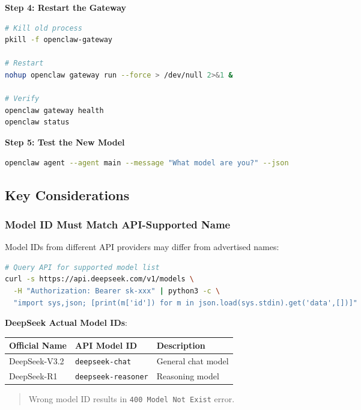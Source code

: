 \textbf{Step 4: Restart the Gateway}

\begin{lstlisting}[language=bash]
# Kill old process
pkill -f openclaw-gateway

# Restart
nohup openclaw gateway run --force > /dev/null 2>&1 &

# Verify
openclaw gateway health
openclaw status
\end{lstlisting}

\textbf{Step 5: Test the New Model}

\begin{lstlisting}[language=bash]
openclaw agent --agent main --message "What model are you?" --json
\end{lstlisting}

\subsection{Key Considerations}


\subsubsection{Model ID Must Match API-Supported Name}


Model IDs from different API providers may differ from advertised names:

\begin{lstlisting}[language=bash]
# Query API for supported model list
curl -s https://api.deepseek.com/v1/models \
  -H "Authorization: Bearer sk-xxx" | python3 -c \
  "import sys,json; [print(m['id']) for m in json.load(sys.stdin).get('data',[])]"
\end{lstlisting}

\textbf{DeepSeek Actual Model IDs}:

\begin{table}[h]
\centering
\small
\begin{tabular}{|l|l|l|}
\hline
Official Name & API Model ID & Description \\
\hline
DeepSeek-V3.2 & \texttt{deepseek-chat} & General chat model \\
\hline
DeepSeek-R1 & \texttt{deepseek-reasoner} & Reasoning model \\
\hline
\end{tabular}
\end{table}

\begin{quote}
Wrong model ID results in \texttt{400 Model Not Exist} error.
\end{quote}

